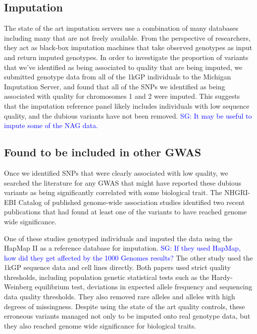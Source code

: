 \documentclass[9pt,lineno]{elife}
\newcommand{\sgcomment}[1]{\textcolor{blue}{SG: #1}}
\newcommand{\luke}[1]{\textcolor{blue}{Luke: #1}}
\begin{document}
\subsection{Imputation}
The state of the art imputation servers use a combination of many databases including many that are not freely available.
From the perspective of researchers, they act as black-box imputation machines that take observed genotypes as input and return imputed genotypes.  
In order to investigate the proportion of variants that we've identified as being associated to quality that are being imputed, we submitted genotype data from all of the 1kGP individuals to the Michigan Imputation Server, and found that all of the SNPs we identified as being associated with quality for chromosomes 1 and 2 were imputed. This suggests that the imputation reference panel likely includes individuals with low sequence quality, and the dubious variants have not been removed. 
\sgcomment{It may be useful to impute some of the NAG data.} 


\subsection{Found to be included in other GWAS }
Once we identified SNPs that were clearly associated with low quality, we searched the literature for any GWAS that might have reported these dubious variants as being significantly correlated with some biological trait. 
The NHGRI-EBI Catalog of published genome-wide association studies identified two recent publications that had found at least one of the variants to have reached genome wide significance.

One of these studies genotyped individuals and imputed the data using the HapMap II as a reference  database for imputation. \sgcomment{If they used HapMap, how did they get affected by the 1000 Genomes results?}
The other study used the 1kGP sequence data and cell lines directly.
Both papers used strict quality thresholds, including population genetic statistical tests such as the Hardy-Weinberg equilibrium test, deviations in expected allele frequency and sequencing data quality thresholds. 
They also removed rare alleles and alleles with high degrees of missingness. 
Despite using the state of the art quality controls, these erroneous variants managed not only to be imputed onto real genotype data, but they also reached genome wide significance for biological traits.
\end{document}
